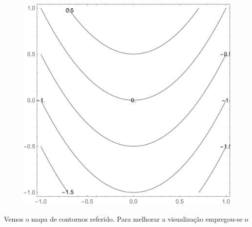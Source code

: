\documentclass[a4paper, 12pt]{article}
\begin{document}
	\begin{figure}[!h]
		\centering
		\includegraphics[scale=.47]{images/ContourLabels}
	\end{figure}

	Vemos o mapa de contornos referido. Para melhorar a visualização empregou-se o 
\end{document}
